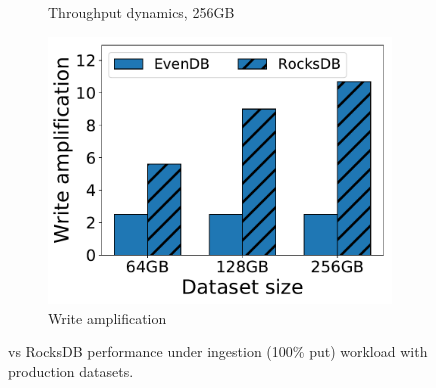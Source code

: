 \begin{figure}[tb]
\begin{subfigure}{0.29\linewidth}
\caption{Throughput dynamics, 256GB}
\label{fig:prod:ingestion:b}
\end{subfigure}
\hspace{0.03\linewidth} 
\begin{subfigure}{0.29\linewidth}
\includegraphics[width=\textwidth]{figs/write_amp_256.pdf}
\caption{Write amplification}
\label{fig:prod:ingestion:c}
\end{subfigure}
\caption{\sys\/ vs RocksDB performance under ingestion (100\% put) workload with production datasets.}
\label{fig:prod:ingestion}
\end{figure}

